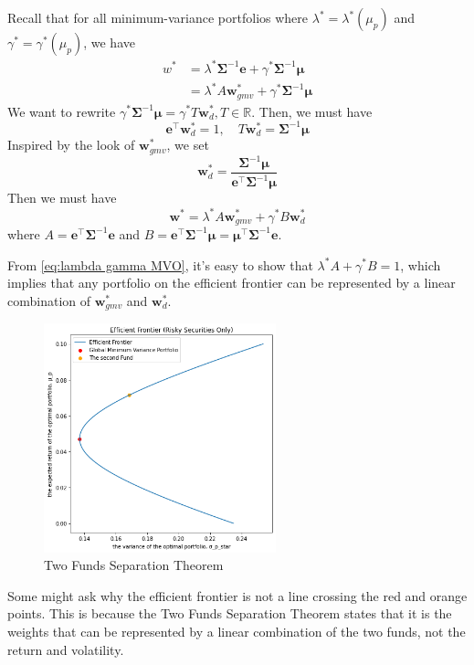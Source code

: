 \documentclass[13pt]{article}
\theoremstyle{definition}
\theoremstyle{remark}
\newenvironment{remark}
  {\pushQED{\qed}\renewcommand{\qedsymbol}{$\triangle$}\remarkx}
  {\popQED\endremarkx}
\begin{document}
Recall that for all minimum-variance portfolios where $\lambda^{*}=\lambda^{*}\left(\mu_p\right)$ and $\gamma^{*}=\gamma^{*}\left(\mu_p\right)$, we have
\begin{align*}
    w^{*}&=\lambda^{*} \mathbf{\Sigma}^{-1} \bm{e}+\gamma^{*} \mathbf{\Sigma}^{-1} \bm{\mu}\\
    &=\lambda^{*} A \bm{w}_{gmv}^{*}+\gamma^{*} \mathbf{\Sigma}^{-1} \bm{\mu}
\end{align*}
We want to rewrite $\gamma^{*} \mathbf{\Sigma}^{-1} \bm{\mu}= \gamma^{*} T\bm{w}^*_d, T\in \mathbb{R}$. Then, we must have
\[
\bm{e}^\top \bm{w}_d^{*}=1, \quad T\bm{w}^*_d = \mathbf{\Sigma}^{-1} \bm{\mu}
\]
Inspired by the look of $\bm{w}_{gmv}^{*}$, we set 
$$
\bm{w}^*_d=\frac{\mathbf{\Sigma}^{-1} \bm{\mu}}{\bm{e}^{\top} \mathbf{\Sigma}^{-1} \bm{\mu}}
$$
Then we must have 
{\color{C6}$$
\bm{w}^{*}=\lambda^{*} A \bm{w}_{gmv}^{*}+\gamma^{*} B \bm{w}^*_d
$$}
where $A=\bm{e}^{\top}\mathbf{\Sigma}^{-1} \bm{e}$ and $B=\bm{e}^{\top}\mathbf{\Sigma}^{-1}\bm{\mu}=\bm{\mu}^{\top} \mathbf{\Sigma}^{-1}\bm{e}$. 

From \cref{eq:lambda gamma MVO}, it's easy to show that $\lambda^{*} A+\gamma^{*} B =1$, which implies that any portfolio on the efficient frontier can be represented by a linear combination of $\bm{w}_{gmv}^{*}$ and $\bm{w}^*_d$.

\begin{figure}[!htp]
    \centering
    \includegraphics[width=0.6\textwidth]{Two Funds Separation Theorem.png}
    \caption{Two Funds Separation Theorem}
    \label{fig:Two Funds Separation Theorem}
\end{figure}
\begin{remark}
    Some might ask why the efficient frontier is not a line crossing the red and orange points. This is because the Two Funds Separation Theorem states that it is the weights that can be represented by a linear combination of the two funds, not the return and volatility.
\end{remark}
\end{document}
